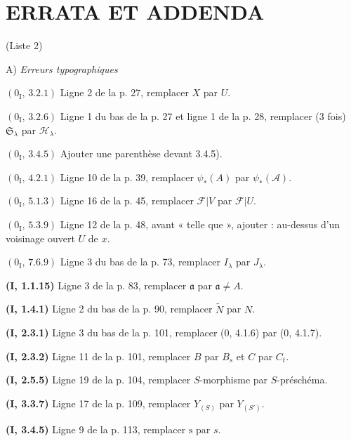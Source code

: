 \clearpage
\thispagestyle{empty}
\null
\clearpage

\section*{ERRATA ET ADDENDA}
\begin{center}
(Liste 2)

\medskip
A) \emph{Erreurs typographiques}
\end{center}

\noindent\textbf{$(0_{\mathrm I},\,3.2.1)$} Ligne 2 de la p. 27, remplacer $X$
par $U$.

\noindent\textbf{$(0_{\mathrm I},\,3.2.6)$} Ligne 1 du bas de la p. 27 et ligne
1 de la p. 28, remplacer (3 fois) $\mathfrak S_\lambda$ par
$\mathscr H_\lambda$.

\noindent\textbf{$(0_{\mathrm I},\,3.4.5)$} Ajouter une parenthèse devant
3.4.5).

\noindent\textbf{$(0_{\mathrm I},\,4.2.1)$} Ligne 10 de la p. 39, remplacer
$\psi_*(A)$ par $\psi_*(\mathscr A)$.

\noindent\textbf{$(0_{\mathrm I},\,5.1.3)$} Ligne 16 de la p. 45, remplacer
$\mathscr F|V$ par $\mathscr F|U$.

\noindent\textbf{$(0_{\mathrm I},\,5.3.9)$} Ligne 12 de la p. 48, avant
« telle que », ajouter : au-dessus d'un voisinage ouvert $U$ de $x$.

\noindent\textbf{$(0_{\mathrm I},\,7.6.9)$} Ligne 3 du bas de la p. 73,
remplacer $I_\lambda$ par $J_\lambda$.

\noindent\textbf{(I, 1.1.15)} Ligne 3 de la p. 83, remplacer $\mathfrak a$ par
$\mathfrak a\ne A$.

\noindent\textbf{(I, 1.4.1)} Ligne 2 du bas de la p. 90, remplacer
$\widetilde N$ par $N$.

\noindent\textbf{(I, 2.3.1)} Ligne 3 du bas de la p. 101, remplacer (0, 4.1.6)
par (0, 4.1.7).

\noindent\textbf{(I, 2.3.2)} Ligne 11 de la p. 101, remplacer $B$ par $B_s$ et
$C$ par $C_t$.

\noindent\textbf{(I, 2.5.5)} Ligne 19 de la p. 104, remplacer $S$-morphisme
par $S$-préschéma.

\noindent\textbf{(I, 3.3.7)} Ligne 17 de la p. 109, remplacer $Y_{(S)}$ par
$Y_{(S')}$.

\noindent\textbf{(I, 3.4.5)} Ligne 9 de la p. 113, remplacer $\mathrm s$ par
$s$.


